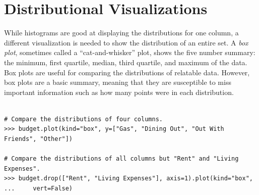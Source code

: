 \section*{Distributional Visualizations} %

While histograms are good at displaying the distributions for one column, a different visualization is needed to show the distribution of an entire set.
A \emph{box plot}, sometimes called a ``cat-and-whisker'' plot, shows the five number summary: the minimum, first quartile, median, third quartile, and maximum of the data.
Box plots are useful for comparing the distributions of relatable data.
However, box plots are a basic summary, meaning that they are susceptible to  miss important information such as how many points were in each distribution.

\begin{lstlisting}

# Compare the distributions of four columns.
>>> budget.plot(kind="box", y=["Gas", "Dining Out", "Out With Friends", "Other"])

# Compare the distributions of all columns but "Rent" and "Living Expenses".
>>> budget.drop(["Rent", "Living Expenses"], axis=1).plot(kind="box",
...		vert=False)
\end{lstlisting}

